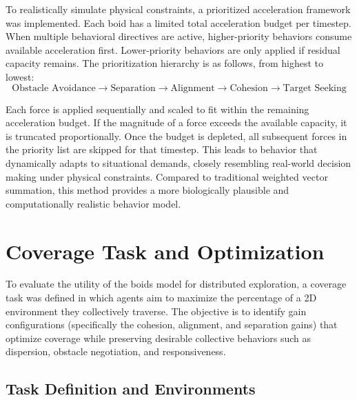 \documentclass[12pt]{article}
\begin{document}
\sloppypar
To realistically simulate physical constraints, a prioritized acceleration framework was implemented. Each boid has a limited total acceleration budget per timestep. When multiple behavioral directives are active, higher-priority behaviors consume available acceleration first. Lower-priority behaviors are only applied if residual capacity remains. The prioritization hierarchy is as follows, from highest to lowest:
\begin{equation}\text{Obstacle Avoidance} \to \text{Separation} \to \text{Alignment} \to \text{Cohesion} \to \text{Target Seeking}\end{equation}

Each force is applied sequentially and scaled to fit within the remaining acceleration budget. If the magnitude of a force exceeds the available capacity, it is truncated proportionally. Once the budget is depleted, all subsequent forces in the priority list are skipped for that timestep. This leads to behavior that dynamically adapts to situational demands, closely resembling real-world decision making under physical constraints. Compared to traditional weighted vector summation, this method provides a more biologically plausible and computationally realistic behavior model.

\section{Coverage Task and Optimization}

To evaluate the utility of the boids model for distributed exploration, a coverage task was defined in which agents aim to maximize the percentage of a 2D environment they collectively traverse. The objective is to identify gain configurations (specifically the cohesion, alignment, and separation gains) that optimize coverage while preserving desirable collective behaviors such as dispersion, obstacle negotiation, and responsiveness.

\subsection{Task Definition and Environments}
\end{document}
